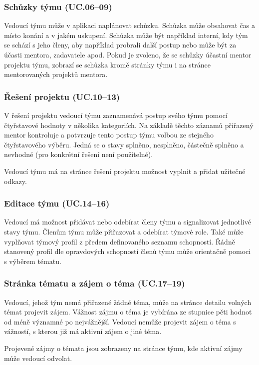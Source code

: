 \documentclass[czech,BP]{thesiskiv}
\begin{document}
			\subsubsection{Schůzky týmu (UC.06--09)}
				\par Vedoucí týmu může v aplikaci naplánovat schůzku. Schůzka může obsahovat čas a místo konání a v jakém uskupení. Schůzka může být například interní, kdy tým se schází s jeho členy, aby například probrali další postup nebo může být za účasti mentora, zadavatele apod. Pokud je zvoleno, že se schůzky účastní mentor projektu týmu, zobrazí se schůzka kromě stránky týmu i na stránce mentorovaných projektů mentora.
			\subsubsection{Řešení projektu (UC.10--13)}
				\par V řešení projektu vedoucí týmu zaznamenává postup svého týmu pomocí čtyřstavové hodnoty v několika kategoriích. Na základě těchto záznamů přiřazený mentor kontroluje a potvrzuje tento postup týmu volbou ze stejného čtyřstavového výběru. Jedná se o stavy splněno, nesplněno, částečně splněno a nevhodné (pro konkrétní řešení není použitelné).
				\par Vedoucí týmu má na stránce řešení projektu možnost vyplnit a přidat užitečné odkazy.
			\subsubsection{Editace týmu (UC.14--16)}
				\par Vedoucí má možnost přidávat nebo odebírat členy týmu a signalizovat jednotlivé stavy týmu. Členům týmu může přiřazovat a odebírat týmové role. Také může vyplňovat týmový profil z předem definovaného seznamu schopností. Řádně stanovený profil dle opravdových schopností členů týmu může orientačně pomoci s výběrem tématu.
			\subsubsection{Stránka tématu a zájem o téma (UC.17--19)}
				\par Vedoucí, jehož tým nemá přiřazené žádné téma, může na stránce detailu volných témat projevit zájem. Vážnost zájmu o téma je vybírána ze stupnice pěti hodnot od méně významné po nejvážnější. Vedoucí nemůže projevit zájem o téma s vážností, s kterou již má aktivní zájem o jiné téma.
				\par Projevené zájmy o témata jsou zobrazeny na stránce týmu, kde aktivní zájmy může vedoucí odvolat.
\end{document}
